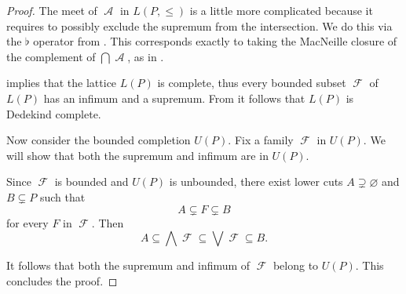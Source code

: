 \begin{proof}
  The meet of \( \mscrA \) in \( L(P, \leq) \) is a little more complicated because it requires to possibly exclude the supremum from the intersection. We do this via the \( \flat \) operator from .  This corresponds exactly to taking the MacNeille closure of the complement of \( \bigcap \mscrA \), as in .

    implies that the lattice \( L(P) \) is complete, thus every bounded subset \( \mscrF \) of \( L(P) \) has an infimum and a supremum. From  it follows that \( L(P) \) is Dedekind complete.

  Now consider the bounded completion \( U(P) \). Fix a family \( \mscrF \) in \( U(P) \). We will show that both the supremum and infimum are in \( U(P) \).

  Since \( \mscrF \) is bounded and \( U(P) \) is unbounded, there exist lower cuts \( A \supsetneq \varnothing \) and \( B \subsetneq P \) such that
  \begin{equation*}
    A \subsetneq F \subsetneq B
  \end{equation*}
  for every \( F \) in \( \mscrF \). Then
  \begin{equation*}
    A \subseteq \bigwedge \mscrF \subseteq \bigvee \mscrF \subseteq B.
  \end{equation*}

  It follows that both the supremum and infimum of \( \mscrF \) belong to \( U(P) \). This concludes the proof.
\end{proof}
